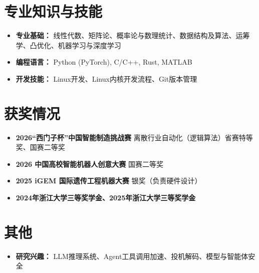 \documentclass[11pt]{article}
\newlength{\intraProjectTitleSep}
\newcommand{\titlebreak}{\\[\intraProjectTitleSep]}
\begin{document}
\section{专业知识与技能}
\begin{itemize}[nosep, itemsep=0em]
    \item \textbf{专业基础：} 线性代数、矩阵论、概率论与数理统计、数据结构及算法、运筹学、凸优化、机器学习与深度学习
    \item \textbf{编程语言：} Python (PyTorch), C/C++, Rust, MATLAB
    \item \textbf{开发技能：} Linux开发、Linux内核开发流程、Git版本管理
\end{itemize}

\section{获奖情况}
\begin{itemize}[itemsep=0.1em]
    \item \textbf{2026“西门子杯”中国智能制造挑战赛} 离散行业自动化（逻辑算法）省赛特等奖、国赛二等奖
    \item \textbf{2026 中国高校智能机器人创意大赛} 国赛二等奖
    \item \textbf{2025 iGEM 国际遗传工程机器大赛} 银奖（负责硬件设计）
    \item \textbf{2024年浙江大学三等奖学金、2025年浙江大学三等奖学金}
\end{itemize}

\section{其他}
\begin{itemize}[itemsep=0.1em]
    \item \textbf{研究兴趣：} LLM推理系统、Agent工具调用加速、投机解码、模型与智能体安全
\end{itemize}
\end{document}
